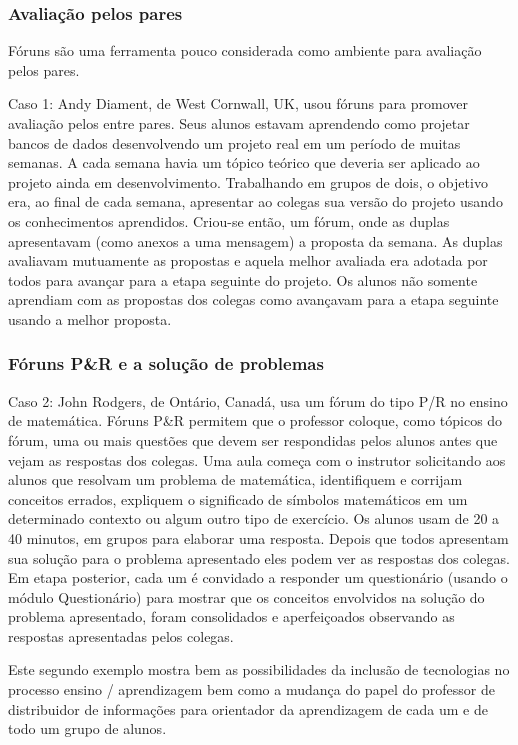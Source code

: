 \subsubsection{Avaliação pelos pares}
Fóruns são uma ferramenta pouco considerada como ambiente para avaliação pelos pares.

Caso 1: Andy Diament, de West Cornwall, UK, usou fóruns para promover avaliação pelos entre pares. Seus alunos estavam aprendendo como projetar bancos de dados desenvolvendo um projeto real em um período de muitas semanas. A cada semana havia um tópico teórico que deveria ser aplicado ao projeto ainda em desenvolvimento. Trabalhando em grupos de dois, o objetivo era, ao final de cada semana, apresentar ao colegas sua versão do projeto usando os conhecimentos aprendidos. Criou-se então, um fórum, onde as duplas apresentavam (como anexos a uma mensagem) a proposta da semana. As duplas avaliavam mutuamente as propostas e aquela melhor avaliada era adotada por todos para avançar para a etapa seguinte do projeto. Os alunos não somente aprendiam com as propostas dos colegas como avançavam  para a etapa seguinte usando a melhor proposta.
\subsubsection{Fóruns P\&R e a solução de problemas}
Caso 2: John Rodgers, de Ontário, Canadá, usa um fórum do tipo P/R no ensino de matemática. Fóruns P\&R permitem que o professor coloque, como tópicos do fórum, uma ou mais questões que devem ser respondidas pelos alunos antes que vejam as respostas dos colegas. Uma aula começa com o instrutor solicitando aos alunos que resolvam um problema de matemática, identifiquem e corrijam conceitos errados, expliquem o significado de símbolos matemáticos em um determinado contexto ou algum outro tipo de exercício. Os alunos usam de 20 a 40 minutos, em grupos para elaborar uma resposta. Depois que todos apresentam sua solução para o problema apresentado eles podem ver as respostas dos colegas. Em etapa posterior, cada um é convidado a responder um questionário (usando o módulo Questionário) para mostrar que os conceitos envolvidos na solução do problema apresentado, foram consolidados e aperfeiçoados observando as respostas apresentadas pelos colegas.

Este segundo exemplo mostra bem as possibilidades da inclusão de tecnologias no processo ensino / aprendizagem bem como a mudança do papel do professor de distribuidor de informações para orientador da aprendizagem de cada um e de todo um grupo de alunos.
